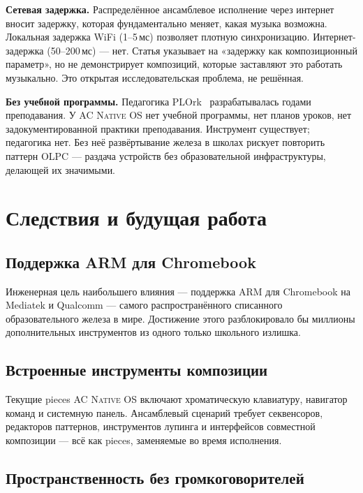 \documentclass[10pt,letterpaper,twocolumn]{article}
\newcommand{\acos}{\textsc{AC Native OS}}
\begin{document}
\textbf{Сетевая задержка.} Распределённое ансамблевое исполнение через интернет вносит задержку, которая фундаментально меняет, какая музыка возможна. Локальная задержка WiFi (1--5\,мс) позволяет плотную синхронизацию. Интернет-задержка (50--200\,мс) --- нет. Статья указывает на «задержку как композиционный параметр», но не демонстрирует композиций, которые заставляют это работать музыкально. Это открытая исследовательская проблема, не решённая.

\textbf{Без учебной программы.} Педагогика PLOrk~\citep{trueman2007why} разрабатывалась годами преподавания. У \acos{} нет учебной программы, нет планов уроков, нет задокументированной практики преподавания. Инструмент существует; педагогика нет. Без неё развёртывание железа в школах рискует повторить паттерн OLPC --- раздача устройств без образовательной инфраструктуры, делающей их значимыми.


\section{Следствия и будущая работа}
\label{sec:future}

\subsection{Поддержка ARM для Chromebook}

Инженерная цель наибольшего влияния --- поддержка ARM для Chromebook на Mediatek и Qualcomm --- самого распространённого списанного образовательного железа в мире. Достижение этого разблокировало бы миллионы дополнительных инструментов из одного только школьного излишка.

\subsection{Встроенные инструменты композиции}

Текущие pieces \acos{} включают хроматическую клавиатуру, навигатор команд и системную панель. Ансамблевый сценарий требует секвенсоров, редакторов паттернов, инструментов лупинга и интерфейсов совместной композиции --- всё как pieces, заменяемые во время исполнения.

\subsection{Пространственность без громкоговорителей}
\end{document}
